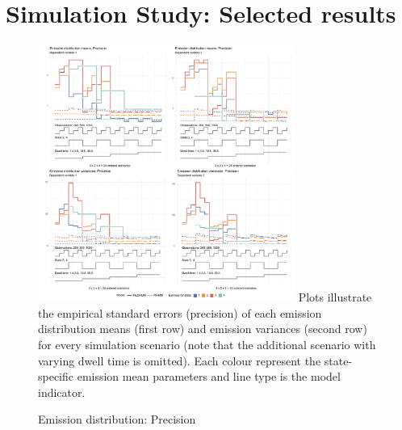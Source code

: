 \section{Simulation Study: Selected results}
\begin{figure}[h]
\caption{Emission distribution: Precision}
    \centering
    \includegraphics[width=0.75\textwidth]{graphics/emiss_sd.pdf}
    \label{prec_emiss}
    \flushleft
    \footnotesize
    \justifying
     Plots illustrate the empirical standard errors (precision) of each emission distribution means (first row) and emission variances (second row) for every simulation scenario (note that the additional scenario with varying dwell time is omitted). Each colour represent the state-specific emission mean parameters and line
type is the model indicator.
\end{figure}

